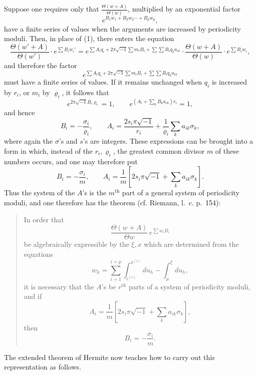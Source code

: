 \documentclass[10pt]{article}
\begin{document}
Suppose one requires only that \(\frac{\Theta(w+A)}{\Theta(w)}\), multiplied by an exponential factor
\[
e^{B_1w_1+B_2w_2\cdots+B_pw_p},
\]
have a finite series of values when the arguments are increased by periodicity moduli. Then, in place of (1), there enters the equation
\[
\frac{\Theta(w'+A)}{\Theta(w')}\cdot e^{\sum B_iw_i'}=
e^{\sum A_iq_i+2\pi\sqrt{-1}\sum m_iB_i+\sum\sum B_iq_ka_{ik}}
\cdot
\frac{\Theta(w+A)}{\Theta(w)}\cdot e^{\sum B_iw_i},
\]
and therefore the factor
\[
e^{\sum A_iq_i+2\pi\sqrt{-1}\sum m_iB_i+\sum\sum B_iq_ka_{ik}}
\]
must have a finite series of values. If it remains unchanged when \(q_i\) is increased by \(r_i\), or \(m_i\) by \(\varrho_i\), it follows that
\[
e^{2\pi\sqrt{-1}B_i\varrho_i}=1,\qquad
e^{(A_i+\sum_kB_ka_{ik})r_i}=1,
\]
and hence
\[
B_i=-\frac{\sigma_i}{\varrho_i},\qquad
A_i=\frac{2s_i\pi\sqrt{-1}}{r_i}+\frac{1}{\varrho_i}\sum_k a_{ik}\sigma_k,
\]
where again the \(\sigma\)'s and \(s\)'s are integers. These expressions can be brought into a form in which, instead of the \(r_i,\varrho_i\), the greatest common divisor \(m\) of these numbers occurs, and one may therefore put
\[
B_i=-\frac{\sigma_i}{m},\qquad
A_i=\frac1m\left[2s_i\pi\sqrt{-1}+\sum_k a_{ik}\sigma_k\right].
\]
Thus the system of the \(A\)'s is the \(m^{\text{th}}\) part of a general system of periodicity moduli, and one therefore has the theorem (cf. Riemann, l.~c. p.~154):

\begin{quote}
In order that
\[
\frac{\Theta(w+A)}{\Theta w}\,e^{\sum w_iB_i}
\]
be algebraically expressible by the \(\xi,x\) which are determined from the equations
\[
w_h=\sum_{i=1}^{i=p}\int_{c^{(i)}}^{x^{(i)}}du_h-\int_{\mu}^{\xi}du_h,
\]
it is necessary that the \(A\)'s be \(r^{\text{th}}\) parts of a system of periodicity moduli, and if
\[
A_i=\frac1m\left[2s_i\pi\sqrt{-1}+\sum_k a_{ik}\sigma_k\right],
\]
then
\[
B_i=-\frac{\sigma_i}{m}.
\]
\end{quote}

The extended theorem of Hermite now teaches how to carry out this representation as follows.
\end{document}
